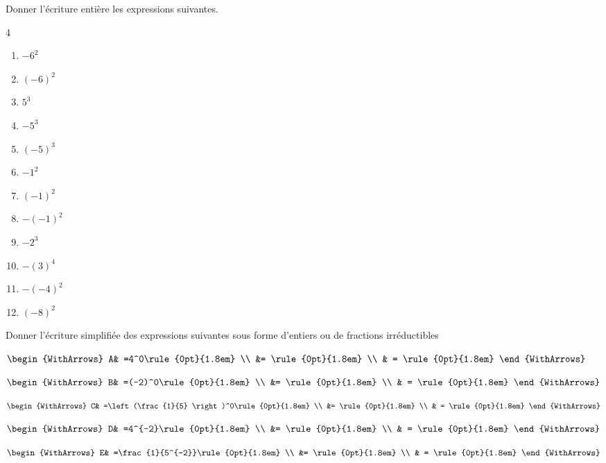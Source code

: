 \documentclass[main.tex]{subfiles}
\begin{document}
\begin{exercise} Donner l'écriture entière les expressions suivantes.
	
	\begin{multicols}{4}
	\begin{enumerate}[label={$\Alph*=$\rule{0pt}{1.6em}},leftmargin=*] 
		\item $-6^2$
		\item $(-6)^2$
		\item $5^3$
		\item $-5^3$
		\item $(-5)^3$
		\item $-1^2$
		\item $(-1)^2$
		\item $-(-1)^2$
		\item $-2^3$
		\item $-(3)^4$
		\item $-(-4)^2$
		\item $(-8)^2$
\end{enumerate}
\end{multicols}
\end{exercise}
\begin{example} Donner l'écriture simplifiée des expressions suivantes sous forme d'entiers ou de fractions irréductibles
	
	\noindent\hfill\parbox{0.19\linewidth}{	
		$\begin{WithArrows}
			A& =4^0\rule{0pt}{1.8em}  \\
			&= \rule{0pt}{1.8em}  \\
			& =  \rule{0pt}{1.8em}  
		\end{WithArrows}$ 	
	} \hfill\parbox{0.19\linewidth}{	
		$\begin{WithArrows}
			B& =(-2)^0\rule{0pt}{1.8em} \\
			&= \rule{0pt}{1.8em} \\
			& = \rule{0pt}{1.8em}    
		\end{WithArrows}$ 	
	}  \hfill\parbox{0.19\linewidth}{	
		$\begin{WithArrows}
			C& =\left(\frac{1}{5} \right)^0\rule{0pt}{1.8em} \\
			&= \rule{0pt}{1.8em} \\
			& = \rule{0pt}{1.8em}   
		\end{WithArrows}$
	}  \hfill\parbox{0.19\linewidth}{	
		$\begin{WithArrows}
			D& =4^{-2}\rule{0pt}{1.8em} \\
			&= \rule{0pt}{1.8em} \\
			& = \rule{0pt}{1.8em}    
		\end{WithArrows}$
	}  \hfill\parbox{0.19\linewidth}{	
	$\begin{WithArrows}
		E& =\frac{1}{5^{-2}}\rule{0pt}{1.8em} \\
		&= \rule{0pt}{1.8em} \\
		& = \rule{0pt}{1.8em}    
	\end{WithArrows}$
}  
\end{example}
\end{document}
